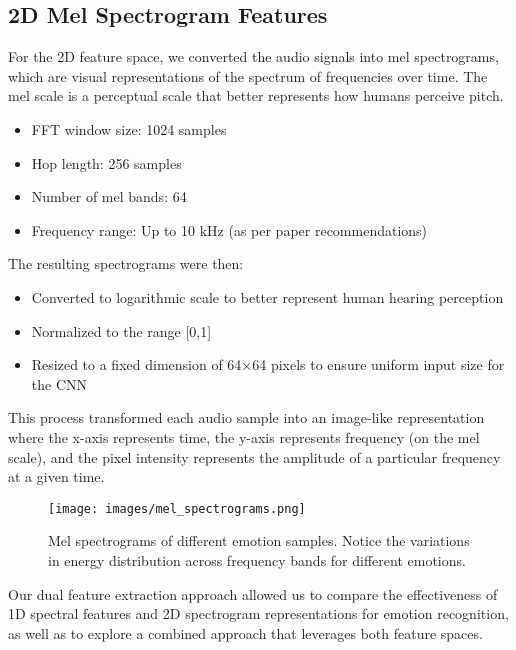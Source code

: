 \subsection{2D Mel Spectrogram Features}

For the 2D feature space, we converted the audio signals into mel spectrograms, which are visual representations of the spectrum of frequencies over time. The mel scale is a perceptual scale that better represents how humans perceive pitch.

\begin{itemize}
    \item FFT window size: 1024 samples
    \item Hop length: 256 samples
    \item Number of mel bands: 64
    \item Frequency range: Up to 10 kHz (as per paper recommendations)
\end{itemize}

The resulting spectrograms were then:
\begin{itemize}
    \item Converted to logarithmic scale to better represent human hearing perception
    \item Normalized to the range [0,1]
    \item Resized to a fixed dimension of 64×64 pixels to ensure uniform input size for the CNN
\end{itemize}

This process transformed each audio sample into an image-like representation where the x-axis represents time, the y-axis represents frequency (on the mel scale), and the pixel intensity represents the amplitude of a particular frequency at a given time.

\begin{figure}[h]
    \centering
    \texttt{[image: images/mel\_spectrograms.png]}
    \caption{Mel spectrograms of different emotion samples. Notice the variations in energy distribution across frequency bands for different emotions.}
    \label{fig:mel_specs}
\end{figure}

Our dual feature extraction approach allowed us to compare the effectiveness of 1D spectral features and 2D spectrogram representations for emotion recognition, as well as to explore a combined approach that leverages both feature spaces. 